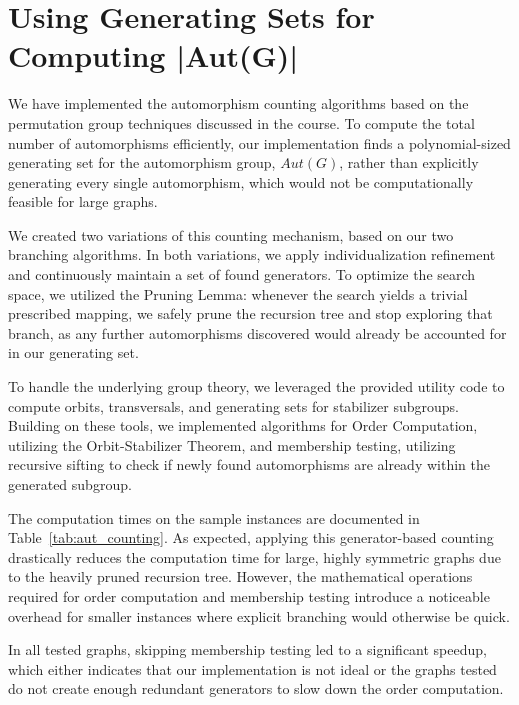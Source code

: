 \documentclass[twoside]{article}
\begin{document}
\section{Using Generating Sets for Computing |Aut(G)|}

We have implemented the automorphism counting algorithms based on the permutation group techniques discussed in the course.
To compute the total number of automorphisms efficiently, our implementation finds a polynomial-sized generating set for the automorphism group, $Aut(G)$, rather than explicitly generating every single automorphism, which would not be computationally feasible for large graphs.

We created two variations of this counting mechanism, based on our two branching algorithms.
In both variations, we apply individualization refinement and continuously maintain a set of found generators.
To optimize the search space, we utilized the Pruning Lemma: whenever the search yields a trivial prescribed mapping, we safely prune the recursion tree and stop exploring that branch, as any further automorphisms discovered would already be accounted for in our generating set.

To handle the underlying group theory, we leveraged the provided utility code to compute orbits, transversals, and generating sets for stabilizer subgroups.
Building on these tools, we implemented algorithms for Order Computation, utilizing the Orbit-Stabilizer Theorem, and membership testing, utilizing recursive sifting to check if newly found automorphisms are already within the generated subgroup. %

The computation times on the sample instances are documented in Table~\ref{tab:aut_counting}.
As expected, applying this generator-based counting drastically reduces the computation time for large, highly symmetric graphs due to the heavily pruned recursion tree.
However, the mathematical operations required for order computation and membership testing introduce a noticeable overhead for smaller instances where explicit branching would otherwise be quick.

In all tested graphs, skipping membership testing led to a significant speedup, which either indicates that our implementation is not ideal or the graphs tested do not create enough redundant generators to slow down the order computation.
\end{document}
